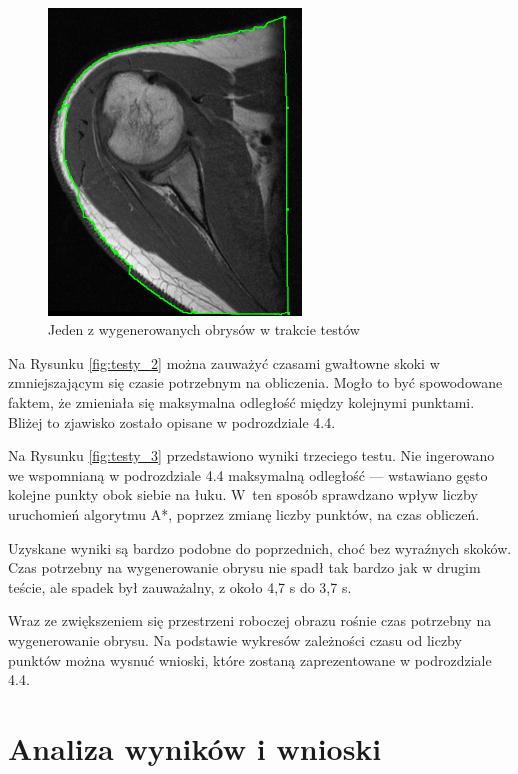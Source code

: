 \documentclass[a4paper,11pt,twoside,openright]{report}
\theoremstyle{definition}
\begin{document}
\begin{figure}[h!]
	\center
	\includegraphics[width=0.6\textwidth]{108}
	\caption{Jeden z wygenerowanych obrysów w trakcie testów}
    	\label{fig:108}
\end{figure}


Na Rysunku \ref{fig:testy_2} można zauważyć czasami gwałtowne skoki w zmniejszającym
się czasie potrzebnym na obliczenia. Mogło to być spowodowane faktem, że zmieniała
się maksymalna odległość między kolejnymi punktami. Bliżej to zjawisko zostało
opisane w podrozdziale 4.4.

Na Rysunku \ref{fig:testy_3} przedstawiono wyniki trzeciego testu. Nie ingerowano
we wspomnianą w podrozdziale 4.4 maksymalną odległość --- wstawiano gęsto kolejne
punkty obok siebie na łuku. W~ten sposób sprawdzano wpływ liczby uruchomień
algorytmu A*, poprzez zmianę liczby punktów, na czas obliczeń.

Uzyskane wyniki są bardzo podobne do poprzednich, choć bez wyraźnych skoków.
Czas potrzebny na wygenerowanie obrysu nie spadł tak bardzo jak w drugim teście,
ale spadek był zauważalny, z około 4,7 s do 3,7 s.

Wraz ze zwiększeniem się przestrzeni roboczej obrazu rośnie czas potrzebny na
wygenerowanie obrysu. Na podstawie wykresów zależności czasu od liczby punktów
można wysnuć wnioski, które zostaną zaprezentowane w podrozdziale 4.4.

\section {Analiza wyników i wnioski}
\end{document}
